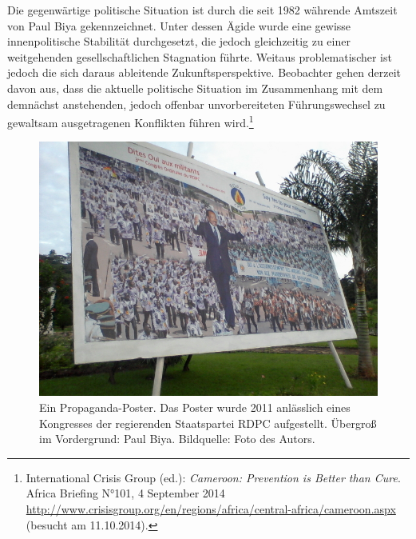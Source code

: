 \documentclass[a4paper,
fontsize=11pt,
oneside,
numbers=noperiodatend,
parskip=half-,
bibliography=totoc,
final
]{scrartcl}
\begin{document}
Die gegenwärtige politische Situation ist durch die seit 1982 währende
Amtszeit von Paul Biya gekennzeichnet. Unter dessen Ägide wurde eine
gewisse innenpolitische Stabilität durchgesetzt, die jedoch gleichzeitig
zu einer weitgehenden gesellschaftlichen Stagnation führte. Weitaus
problematischer ist jedoch die sich daraus ableitende
Zukunftsperspektive. Beobachter gehen derzeit davon aus, dass die
aktuelle politische Situation im Zusammenhang mit dem demnächst
anstehenden, jedoch offenbar unvorbereiteten Führungswechsel zu
gewaltsam ausgetragenen Konflikten führen wird.\footnote{International
  Crisis Group (ed.): \emph{Cameroon: Prevention is Better than Cure}.
  Africa Briefing N°101, 4 September 2014
  \url{http://www.crisisgroup.org/en/regions/africa/central-africa/cameroon.aspx}
  (besucht am 11.10.2014).}

\begin{figure}[htbp]
\centering
\includegraphics{img/Biya.jpg}
\caption{Ein Propaganda-Poster. Das Poster wurde 2011 anlässlich eines
Kongresses der regierenden Staatspartei RDPC aufgestellt. Übergroß im
Vordergrund: Paul Biya. Bildquelle: Foto des Autors.}
\end{figure}
\end{document}
